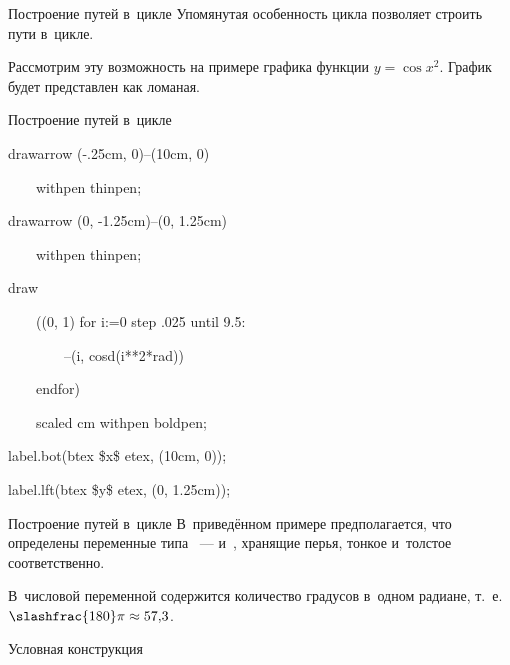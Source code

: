 \begin{frame}{Построение путей в~цикле}
Упомянутая особенность цикла  позволяет строить пути в~цикле.

Рассмотрим эту возможность на примере графика функции $y=\cos x^2$. График
будет представлен как ломаная.
\begin{center}
\end{center}
\end{frame}

\begin{frame}{Построение путей в~цикле}
\begin{programlisting}%
drawarrow (-.25cm, 0)--(10cm, 0)\par
~~~~withpen thinpen;\par
drawarrow (0, -1.25cm)--(0, 1.25cm)\par
~~~~withpen thinpen;\par
\leavevmode\par
draw\par
~~~~((0, 1) for i:=0 step .025 until 9.5:\par
~~~~~~~~--(i, cosd(i**2*rad))\par
~~~~endfor)\par
~~~~scaled cm withpen boldpen;\par
\leavevmode\par
label.bot(btex \$x\$ etex, (10cm, 0));\par
label.lft(btex \$y\$ etex, (0, 1.25cm));
\end{programlisting}
\end{frame}

\begin{frame}{Построение путей в~цикле}
В~приведённом примере предполагается, что определены переменные типа
~—  и~, хранящие перья, тонкое
и~толстое соответственно.

В~числовой переменной  содержится количество градусов в~одном
радиане, т.~е. $\slashfrac{180}\pi\approx57{,}3$.
\end{frame}

\begin{frame}{Условная конструкция}
\begin{flushleft}
\LARGE
{}\literal{:~}\\
\end{flushleft}
\end{frame}

